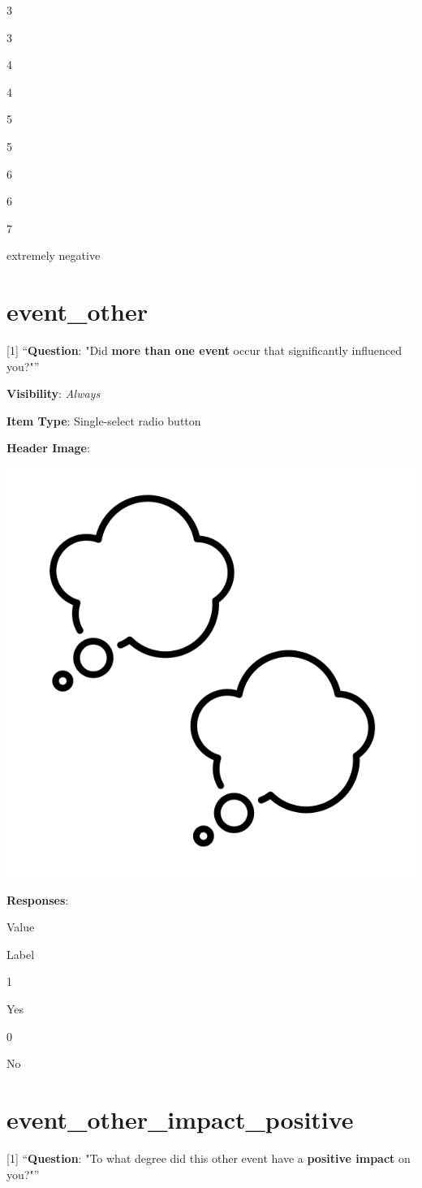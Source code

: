 \documentclass[]{book}
\begin{document}
3

3

4

4

5

5

6

6

7

extremely negative

\hypertarget{event_other}{%
\section{event\_other}\label{event_other}}

{[}1{]} ``\textbf{Question}: "Did \textbf{more than one event} occur that significantly influenced you?"''

\textbf{Visibility}: \emph{Always}

\textbf{Item Type}: Single-select radio button

\textbf{Header Image}:

\begin{flushleft}\includegraphics[width=0.33\linewidth]{downloadFigs4latex_NIMH_Applet_Codebook/event_other_headerImg} \end{flushleft}

\textbf{Responses}:

Value

Label

1

Yes

0

No

\hypertarget{event_other_impact_positive}{%
\section{event\_other\_impact\_positive}\label{event_other_impact_positive}}

{[}1{]} ``\textbf{Question}: "To what degree did this other event have a \textbf{positive impact} on you?"''
\end{document}

